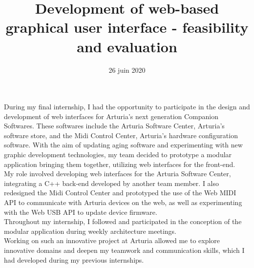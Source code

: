 \documentclass[francais]{rapportPFE}  %
\title{Development of web-based graphical user interface - feasibility and evaluation}
\date{26 juin 2020}
\begin{document}
\maketitle



\begin{ResumeMotsCles}

\begin{resumeEn}
During my final internship, I had the opportunity to participate in the design and development of web interfaces for Arturia's next generation Companion Softwares. These softwares include the Arturia Software Center, Arturia's software store, and the Midi Control Center, Arturia's hardware configuration software. With the aim of updating aging software and experimenting with new graphic development technologies, my team decided to prototype a modular application bringing them together, utilizing web interfaces for the front-end.\\
My role involved developing web interfaces for the Arturia Software Center, integrating a C++ back-end developed by another team member. I also redesigned the Midi Control Center and prototyped the use of the Web MIDI API to communicate with Arturia devices on the web, as well as experimenting with the Web USB API to update device firmware.\\
Throughout my internship, I followed and participated in the conception of the modular application during weekly architecture meetings. \\
Working on such an innovative project at Arturia allowed me to explore innovative domains and deepen my teamwork and communication skills, which I had developed during my previous internships. 
\end{resumeEn}




\end{ResumeMotsCles}
\end{document}
